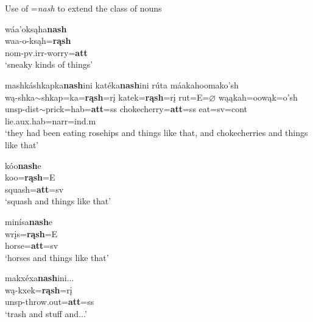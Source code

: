 \begin{exe}

\item\label{attitudinalclasses} Use of =\textit{nash} to extend the class of nouns

	\begin{xlist}
	
	\item\label{attitudinalclasses1} 
	\glll wáa'oksąha\textbf{nash}\\
	waa-o-ksąh=\textbf{rąsh}\\
	nom-pv.irr-\textnormal{worry}=\textbf{att}\\
	\glt `sneaky kinds of things' \citep[80]{hollow1973a}

	\item\label{attitudinalclasses2} 
	\glll mashkáshkapka\textbf{nash}ini katéka\textbf{nash}ini rúta máakahoomako'sh\\
	wą-shka$\sim$shkap=ka=\textbf{rąsh}=rį katek=\textbf{rąsh}=rį rut=E=$\varnothing$ wąąkah=oowąk=o'sh\\
	unsp-dist$\sim$\textnormal{prick}=hab=\textbf{att}=ss \textnormal{chokecherry}=\textbf{att}=ss \textnormal{eat}=sv=cont \textnormal{lie}.aux.hab=narr=ind.m\\
	\glt `they had been eating rosehips and things like that, and chokecherries and things like that' \citep[279]{hollow1973b}

	\item\label{attitudinalclasses3} 
	\glll kóo\textbf{nash}e\\
	koo=\textbf{rąsh}=E\\
	\textnormal{squash}=\textbf{att}=sv\\
	\glt `squash and things like that' \citep[467]{hollow1970}

	\item\label{attitudinalclasses4} 
	\glll minísa\textbf{nash}e\\
	wrįs=\textbf{rąsh}=E\\
	\textnormal{horse}=\textbf{att}=sv\\
	\glt `horses and things like that' \citep[467]{hollow1970}

	\item\label{attitudinalclasses5} 
	\glll makxéxa\textbf{nash}ini...\\
	wą-kxek=\textbf{rąsh}=rį\\
	unsp-\textnormal{throw.out}=\textbf{att}=ss\\
	\glt `trash and stuff and...' \citep[110]{hollow1973a}
	
	\end{xlist}

\end{exe}


